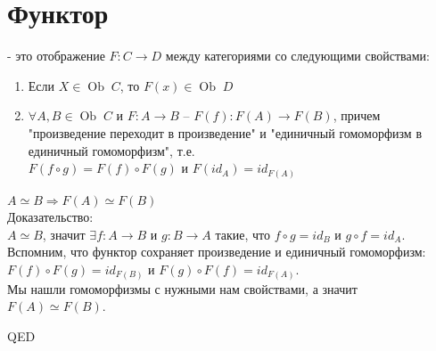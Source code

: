 \documentclass[a4paper]{article}
\theoremstyle{indented}
\theoremstyle{definition}
\theoremstyle{remark}
\DeclareMathOperator{\ra}{\rightarrow}
\DeclareMathOperator{\Ra}{\Rightarrow}
\DeclareMathOperator{\Ob}{Ob}
\begin{document}
\section{Функтор}
 {} - это отображение $F: C \ra D$ между категориями со следующими свойствами:
\begin{enumerate}
    \item Если $X \in\Ob\;C$, то $F(x) \in\Ob\;D$
    \item $\forall A, B \in\Ob\;C$ и $F: A \ra B$ -- $F(f): F(A) \ra F(B)$, причем "произведение переходит в произведение" и "единичный гомоморфизм в единичный гомоморфизм", т.е. \\
    $F(f \circ g) = F(f) \circ F(g)$ и $F(id_A) = id_{F(A)}$
\end{enumerate}
\stat $A \simeq B \Ra F(A) \simeq F(B)$ \\
Доказательство: \\
$A \simeq B$, значит $\exists f: A \ra B$ и $g: B \ra A$ такие, что 
$f \circ g = id_B$ и $g \circ f = id_A$. \\
Вспомним, что функтор сохраняет произведение и единичный гомоморфизм: \\
$F(f) \circ F(g) = id_{F(B)}$ и $F(g) \circ F(f) = id_{F(A)}$. \\
Мы нашли гомоморфизмы с нужными нам свойствами, а значит $F(A) \simeq F(B)$.\\
\begin{flushright}
QED
\end{flushright}
\end{document}
